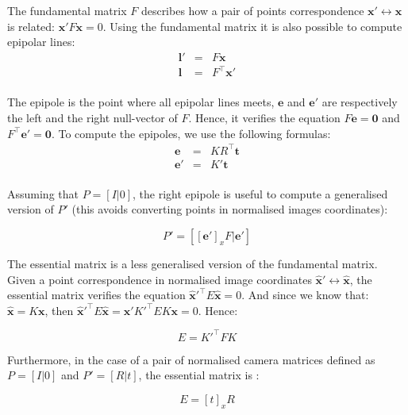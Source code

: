 \documentclass[11pt]{report}
\begin{document}
The fundamental matrix $F$ describes how a pair of points correspondence $\mathbf{x}' \leftrightarrow \mathbf{x}$ is related: $\mathbf{x}'F\mathbf{x} = 0$. Using the fundamental matrix it is also possible to compute epipolar lines:
\[
  \begin{array}{lcl}
        \mathbf{l}' & = & F\mathbf{x} \\
        \mathbf{l} & = & F^\top\mathbf{x}' \\
  \end{array}
\]

The epipole is the point where all epipolar lines meets, $\mathbf{e}$ and $\mathbf{e}'$ are respectively the left and the right null-vector of $F$. Hence, it verifies the equation $F\mathbf{e} = \mathbf{0}$ and $F^\top\mathbf{e}' = \mathbf{0}$. To compute the epipoles, we use the following formulas:
\[
  \begin{array}{lcl}
        \mathbf{e} & = & KR^\top \mathbf{t} \\
        \mathbf{e}' & = & K'\mathbf{t} \\
  \end{array}
\]

Assuming that $P=[I|0]$, the right epipole is useful to compute a generalised version of $P'$ (this avoids converting points in normalised images coordinates):

\begin{equation}
    P' = [[\mathbf{e}']_xF|\mathbf{e}']
\end{equation}

The essential matrix is a less generalised version of the fundamental matrix. Given a point correspondence in normalised image coordinates $\hat{\mathbf{x}}' \leftrightarrow \hat{\mathbf{x}}$, the essential matrix verifies the equation $\hat{\mathbf{x}}'^\top E\hat{\mathbf{x}} = 0$. And since we know that: $\hat{\mathbf{x}} = K\mathbf{x}$, then $\hat{\mathbf{x}}'^\top E\hat{\mathbf{x}} = \mathbf{x}'K'^\top EK\mathbf{x} = 0$. Hence:

\begin{equation}
	E = K'^\top FK
  \label{eq:essential_matrix}
\end{equation}

Furthermore, in the case of a pair of normalised camera matrices defined as $P =[I|0]$ and $P'=[R|t]$, the essential matrix is :

\begin{equation}
    E = [t]_x R
  \label{eq:essential_matrix2}
\end{equation}
\end{document}
